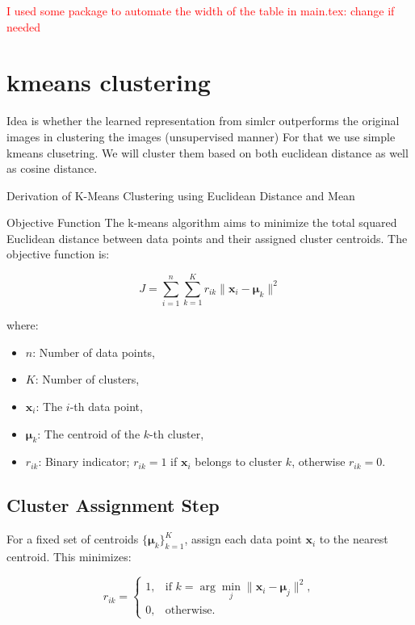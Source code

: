 \textcolor{red}{I used some package to automate the width of the table in main.tex: change if needed} 






\section{kmeans clustering}

Idea is whether the learned representation from simlcr outperforms the original images in clustering the images (unsupervised manner) For that we use simple kmeans 
clusetring. We will cluster them based on both euclidean distance as well as cosine distance.

Derivation of K-Means Clustering using Euclidean Distance and Mean

Objective Function
The k-means algorithm aims to minimize the total squared Euclidean distance between data points and their assigned cluster centroids. The objective function is:

\[
J = \sum_{i=1}^{n} \sum_{k=1}^{K} r_{ik} \| \mathbf{x}_i - \boldsymbol{\mu}_k \|^2
\]

where:
\begin{itemize}
    \item \( n \): Number of data points,
    \item \( K \): Number of clusters,
    \item \( \mathbf{x}_i \): The \( i \)-th data point,
    \item \( \boldsymbol{\mu}_k \): The centroid of the \( k \)-th cluster,
    \item \( r_{ik} \): Binary indicator; \( r_{ik} = 1 \) if \( \mathbf{x}_i \) belongs to cluster \( k \), otherwise \( r_{ik} = 0 \).
\end{itemize}

\subsection*{Cluster Assignment Step}
For a fixed set of centroids \( \{ \boldsymbol{\mu}_k \}_{k=1}^K \), assign each data point \( \mathbf{x}_i \) to the nearest centroid. This minimizes:

\[
r_{ik} =
\begin{cases} 
1, & \text{if } k = \arg\min_{j} \| \mathbf{x}_i - \boldsymbol{\mu}_j \|^2, \\
0, & \text{otherwise.}
\end{cases}
\]

